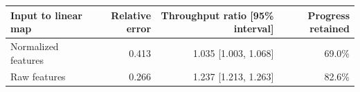 \begin{tabular}{lrrr}
\toprule
Input to linear map & Relative error & Throughput ratio [95\% interval] & Progress retained \\
\midrule
Normalized features & 0.413 & 1.035 [1.003, 1.068] & 69.0\% \\
Raw features & 0.266 & 1.237 [1.213, 1.263] & 82.6\% \\
\bottomrule
\end{tabular}
